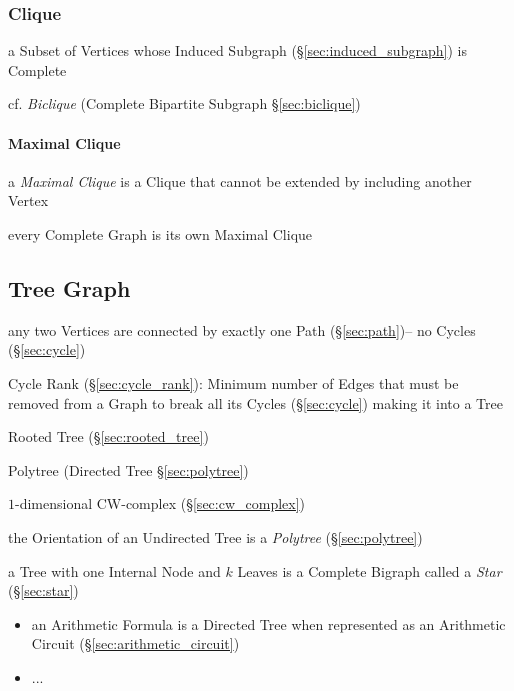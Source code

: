 \subsubsection{Clique}\label{sec:clique}

a Subset of Vertices whose Induced Subgraph (\S\ref{sec:induced_subgraph}) is
Complete

cf. \emph{Biclique} (Complete Bipartite Subgraph \S\ref{sec:biclique})



\paragraph{Maximal Clique}\label{sec:maximal_clique}\hfill

a \emph{Maximal Clique} is a Clique that cannot be extended by including
another Vertex

every Complete Graph is its own Maximal Clique



\subsection{Tree Graph}\label{sec:tree_graph}

any two Vertices are connected by exactly one Path (\S\ref{sec:path})-- no
Cycles (\S\ref{sec:cycle})

Cycle Rank (\S\ref{sec:cycle_rank}): Minimum number of Edges that must be
removed from a Graph to break all its Cycles (\S\ref{sec:cycle}) making it into
a Tree

Rooted Tree (\S\ref{sec:rooted_tree})

Polytree (Directed Tree \S\ref{sec:polytree})

$1$-dimensional CW-complex (\S\ref{sec:cw_complex})

the Orientation of an Undirected Tree is a \emph{Polytree}
(\S\ref{sec:polytree})

a Tree with one Internal Node and $k$ Leaves is a Complete Bigraph called a
\emph{Star} (\S\ref{sec:star})

\begin{itemize}
  \item an Arithmetic Formula is a Directed Tree when represented as an
    Arithmetic Circuit (\S\ref{sec:arithmetic_circuit})
  \item ...
\end{itemize}



